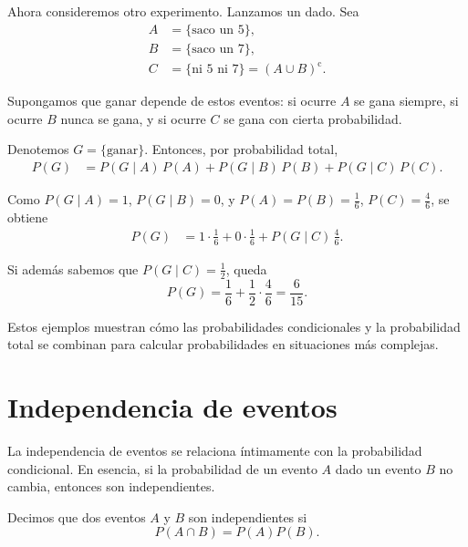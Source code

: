 \begin{example}
    Ahora consideremos otro experimento. Lanzamos un dado. Sea
    \begin{align*}
        A &= \{\text{saco un $5$}\}, \\
        B &= \{\text{saco un $7$}\}, \\
        C &= \{\text{ni $5$ ni $7$}\} = (A \cup B)^{\mathrm c}.
    \end{align*}

    Supongamos que ganar depende de estos eventos: 
    si ocurre $A$ se gana siempre, 
    si ocurre $B$ nunca se gana, 
    y si ocurre $C$ se gana con cierta probabilidad.

    Denotemos $G=\{\text{ganar}\}$. Entonces, por probabilidad total,
    \begin{align*}
        P(G) &= P(G \mid A)\,P(A) + P(G \mid B)\,P(B) + P(G \mid C)\,P(C).
    \end{align*}

    Como $P(G \mid A)=1$, $P(G \mid B)=0$, y $P(A)=P(B)=\frac{1}{6}$, $P(C)=\frac{4}{6}$, se obtiene
    \begin{align*}
        P(G) &= 1 \cdot \frac{1}{6} + 0 \cdot \frac{1}{6} + P(G \mid C)\,\frac{4}{6}.
    \end{align*}

    Si además sabemos que $P(G \mid C)=\frac{1}{2}$, queda
    \begin{equation*}
        P(G) = \frac{1}{6} + \frac{1}{2}\cdot\frac{4}{6} = \frac{6}{15}.
    \end{equation*}
\end{example}

Estos ejemplos muestran cómo las probabilidades condicionales y la probabilidad total se combinan para calcular probabilidades en situaciones más complejas.


\section{Independencia de eventos}

La independencia de eventos se relaciona íntimamente con la probabilidad condicional. En esencia, si la probabilidad de un evento $A$ dado un evento $B$ no cambia, entonces son independientes.

\begin{definition}
    Decimos que dos eventos $A$ y $B$ son independientes si
    \begin{equation*}
        P(A \cap B) = P(A) P(B).
    \end{equation*}
\end{definition}

